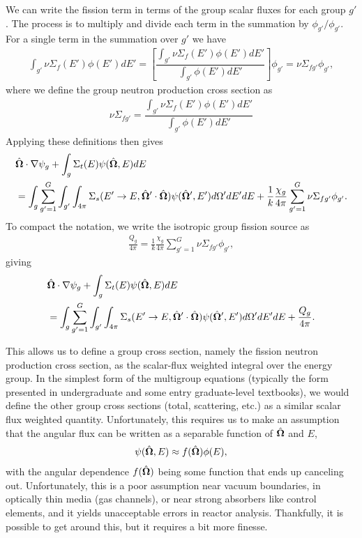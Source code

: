 We can write the fission term in terms of the group scalar fluxes for each group $g'$. The process is to multiply and divide each term in the summation by $\phi_{g'} / \phi_{g'}$. For a single term in the summation over $g'$ we have
\begin{align}
   \int_{g'}  \nu\Sigma_f(E') \phi(E') dE' = \left[ \dfrac{ \displaystyle\int_{g'}  \nu\Sigma_f(E') \phi(E') dE' }{ \displaystyle\int_{g'} \phi(E') dE' } \right] \phi_{g'} = \nu\Sigma_{fg'} \phi_{g'} ,
\end{align}
where we define the group neutron production cross section as
\begin{align}
  \nu\Sigma_{fg'} = \dfrac{ \displaystyle\int_{g'}  \nu\Sigma_f(E') \phi(E') dE' }{ \displaystyle\int_{g'} \phi(E') dE' }
\end{align}
Applying these definitions then gives
\begin{align}
  &\hat{\mathbf{\Omega}} \cdot \nabla \psi_g + \int_g \Sigma_t(E) \psi(\hat{\mathbf{\Omega}},E) dE \nonumber \\*
  &= \int_g \sum_{g'=1}^G \int_{g'} \int_{4\pi} \Sigma_s(E' \rightarrow E, \hat{\mathbf{\Omega}}' \cdot \hat{\mathbf{\Omega}}) \psi(\hat{\mathbf{\Omega}}',E') d\Omega' dE' dE + \frac{1}{k} \frac{\chi_g}{4\pi} \sum_{g'=1}^G  \nu\Sigma_{fg'} \phi_{g'}.
\end{align}
To compact the notation, we write the isotropic group fission source as
\begin{align}
  \frac{Q_g}{4\pi} = \frac{1}{k} \frac{\chi_g}{4\pi} \sum_{g'=1}^G   \nu\Sigma_{fg'} \phi_{g'},
\end{align}
giving
\begin{align}
  &\hat{\mathbf{\Omega}} \cdot \nabla \psi_g + \int_g \Sigma_t(E) \psi(\hat{\mathbf{\Omega}},E) dE \nonumber \\*
  &= \int_g \sum_{g'=1}^G \int_{g'} \int_{4\pi} \Sigma_s(E' \rightarrow E, \hat{\mathbf{\Omega}}' \cdot \hat{\mathbf{\Omega}}) \psi(\hat{\mathbf{\Omega}}',E') d\Omega' dE' dE + \frac{Q_g}{4\pi}.
\end{align}

This allows us to define a group cross section, namely the fission neutron production cross section, as the scalar-flux weighted integral over the energy group. In the simplest form of the multigroup equations (typically the form presented in undergraduate and some entry graduate-level textbooks), we would define the other group cross sections (total, scattering, etc.) as a similar scalar flux weighted quantity. Unfortunately, this requires us to make an assumption that the angular flux can be written as a separable function of $\hat{\mathbf{\Omega}}$ and $E$,
\begin{align}
  \psi(\hat{\mathbf{\Omega}},E) \approx f(\hat{\mathbf{\Omega}}) \phi(E) ,
\end{align}
with the angular dependence $f(\hat{\mathbf{\Omega}})$ being some function that ends up canceling out. Unfortunately, this is a poor assumption near vacuum boundaries, in optically thin media (gas channels), or near strong absorbers like control elements, and it yields unacceptable errors in reactor analysis. Thankfully, it is possible to get around this, but it requires a bit more finesse.

